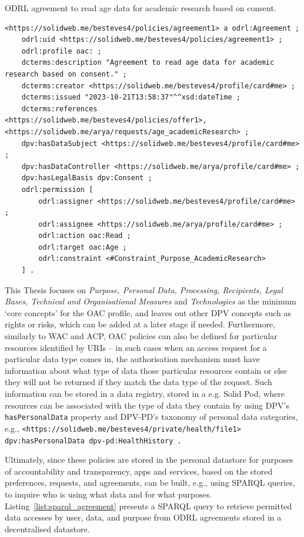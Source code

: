 \begin{listing}[ht]
\caption{ODRL agreement to read age data for academic research based on consent.}
\label{list:oac_agreement}
\begin{verbatim}
<https://solidweb.me/besteves4/policies/agreement1> a odrl:Agreement ;
    odrl:uid <https://solidweb.me/besteves4/policies/agreement1> ;
    odrl:profile oac: ;
    dcterms:description "Agreement to read age data for academic research based on consent." ;
    dcterms:creator <https://solidweb.me/besteves4/profile/card#me> ;
    dcterms:issued "2023-10-21T13:58:37"^^xsd:dateTime ;
    dcterms:references <https://solidweb.me/besteves4/policies/offer1>, <https://solidweb.me/arya/requests/age_academicResearch> ;
    dpv:hasDataSubject <https://solidweb.me/besteves4/profile/card#me> ;
    dpv:hasDataController <https://solidweb.me/arya/profile/card#me> ;
    dpv:hasLegalBasis dpv:Consent ;
    odrl:permission [
        odrl:assigner <https://solidweb.me/besteves4/profile/card#me> ;
        odrl:assignee <https://solidweb.me/arya/profile/card#me> ;
        odrl:action oac:Read ;
        odrl:target oac:Age ;
        odrl:constraint <#Constraint_Purpose_AcademicResearch>
    ] .
\end{verbatim}
\end{listing}

This Thesis focuses on \textit{Purpose, Personal Data, Processing, Recipients, Legal Bases, Technical and Organisational Measures} and \textit{Technologies} as the minimum `core concepts' for the OAC profile, and leaves out other DPV concepts such as rights or risks, which can be added at a later stage if needed.
Furthermore, similarly to WAC and ACP, OAC policies can also be defined for particular resources identified by URIs -- in such cases when an access request for a particular data type comes in, the authorisation mechanism must have information about what type of data those particular resources contain or else they will not be returned if they match the data type of the request.
Such information can be stored in a data registry, stored in a e.g. Solid Pod, where resources can be associated with the type of data they contain by using DPV's \texttt{hasPersonalData} property and DPV-PD's taxonomy of personal data categories, e.g., \texttt{<https://solidweb.me/besteves4/private/health/file1> dpv:hasPersonalData dpv-pd:HealthHistory .}

Ultimately, since these policies are stored in the personal datastore for purposes of accountability and transparency, apps and services, based on the stored preferences, requests, and agreements, can be built, e.g., using SPARQL queries, to inquire who is using what data and for what purposes.
Listing~\ref{list:sparql_agreement} presents a SPARQL query to retrieve permitted data accesses by user, data, and purpose from ODRL agreements stored in a decentralised datastore.

